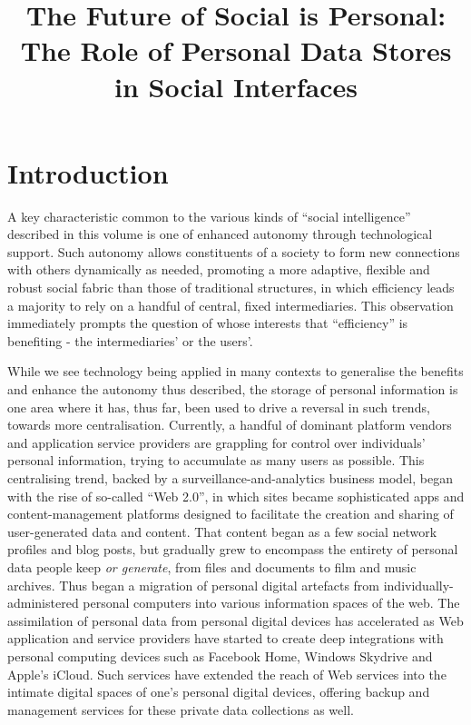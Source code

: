 \documentclass[runningheads,a4paper]{llncs}
\begin{document}
\title{The Future of Social is Personal: The Role of Personal Data Stores in Social Interfaces}


\maketitle

\section{Introduction}

A key characteristic common to the various kinds of ``social intelligence'' described in this volume is one of enhanced autonomy through technological support.  Such autonomy allows constituents of a society to form new connections with others dynamically as needed, promoting a more adaptive, flexible and robust social fabric than those of traditional structures, in which efficiency leads a majority to rely on a handful of central, fixed intermediaries. This observation immediately prompts the question of whose interests that ``efficiency'' is benefiting - the intermediaries' or the users'.

While we see technology being applied in many contexts to generalise the benefits and enhance the autonomy thus described, the storage of personal information is one area where it has, thus far, been used to drive a reversal in such trends, towards more centralisation. Currently, a handful of dominant platform vendors and application service providers are grappling for control over individuals' personal information, trying to accumulate as many users as possible. This centralising trend, backed by a surveillance-and-analytics business model, began with the rise of so-called ``Web 2.0'', in which sites became sophisticated apps and content-management platforms designed to facilitate the creation and sharing of user-generated data and content. That content began as a few social network profiles and blog posts, but gradually grew to encompass the entirety of personal data people keep {\em or generate}, from files and documents to film and music archives. Thus began a migration of personal digital artefacts from individually-administered personal computers into various information spaces of the web.  The assimilation of personal data from personal digital devices has accelerated as Web application and service providers have started to create deep integrations with personal computing devices such as Facebook Home\cite{facebook}, Windows Skydrive\cite{skydrive} and Apple's iCloud\cite{icloud}. Such services have extended the reach of Web services into the intimate digital spaces of one's personal digital devices, offering backup and management services for these private data collections as well.
\end{document}
